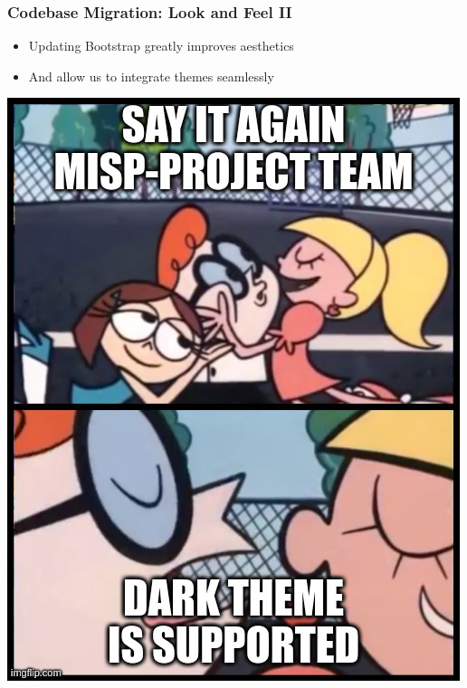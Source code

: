 \begin{frame}
    \frametitle{Codebase Migration: Look and Feel II}
    \begin{minipage}{0.6\textwidth}
        \begin{itemize}
            \item Updating Bootstrap greatly improves aesthetics
            \item And allow us to integrate themes seamlessly
        \end{itemize}
    \end{minipage}%
    \begin{minipage}{0.4\textwidth}
        \begin{center}
            \includegraphics[width=0.9\linewidth]{pictures/dark-theme-meme.jpg}
        \end{center}
    \end{minipage}
\end{frame}

